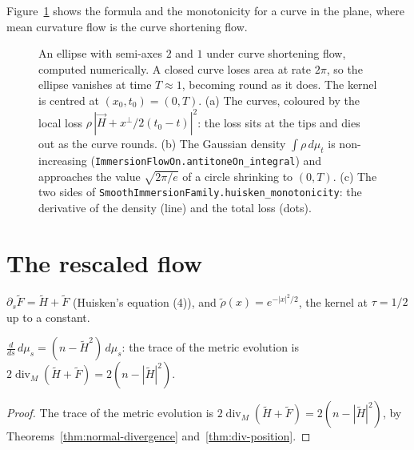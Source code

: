 Figure~\ref{fig:monotone} shows the formula and the monotonicity for a curve in the plane,
where mean curvature flow is the curve shortening flow.

\begin{figure}[htbp]
\centering
{}
\caption{An ellipse with semi-axes $2$ and $1$ under curve shortening flow, computed
numerically. A closed curve loses area at rate $2\pi$, so the ellipse vanishes at time
$T \approx 1$, becoming round as it does. The kernel is centred at $(x_0, t_0) = (0, T)$.
(a) The curves, coloured by the local loss $\rho\,|\vec H + x^\perp/2(t_0 - t)|^2$: the loss
sits at the tips and dies out as the curve rounds. (b) The Gaussian density
$\int \rho\,d\mu_t$ is non-increasing (\texttt{ImmersionFlowOn.antitoneOn\_integral}) and
approaches the value $\sqrt{2\pi/e}$ of a circle shrinking to $(0, T)$. (c) The two sides
of \texttt{SmoothImmersionFamily.huisken\_monotonicity}: the derivative of the density
(line) and the total loss (dots).}
\label{fig:monotone}
\end{figure}

\section{The rescaled flow}

\begin{definition}
  \label{def:rescaled}
  \leanok
  $\partial_s \tilde F = \tilde H + \tilde F$ (Huisken's equation (4)), and
  $\tilde\rho(x) = e^{-|x|^2/2}$, the kernel at $\tau = 1/2$ up to a constant.
\end{definition}

\begin{lemma}
  \label{lem:rescaled-volume}
  \leanok
  $\frac{d}{ds}\,d\mu_s = (n - \tilde H^2)\,d\mu_s$: the trace of the metric evolution is
  $2 \operatorname{div}_M(\tilde H + \tilde F) = 2(n - |\tilde H|^2)$.
\end{lemma}

\begin{proof}
  \leanok
  The trace of the metric evolution is $2\operatorname{div}_M(\tilde H + \tilde F) = 2(n - |\tilde H|^2)$, by Theorems~\ref{thm:normal-divergence} and~\ref{thm:div-position}.
\end{proof}

